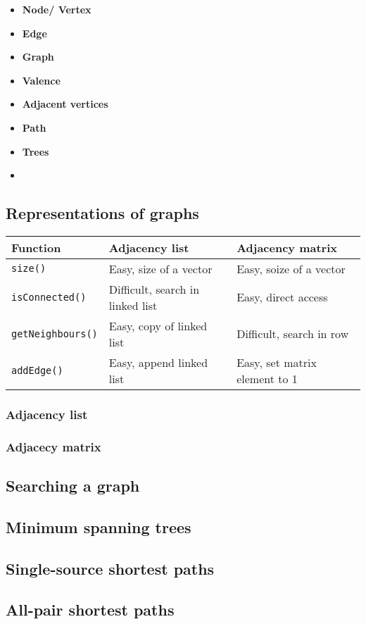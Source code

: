 
\begin{itemize}
    \item \textbf{Node/ Vertex}
    \item \textbf{Edge}
    \item \textbf{Graph}
    \item \textbf{Valence}
    \item \textbf{Adjacent vertices}
    \item \textbf{Path}
    \item \textbf{Trees}
    \item \textbf{}
\end{itemize}

\subsection{Representations of graphs}

\begin{table}[H]
    \centering
    \begin{tabular}{p{30mm} | p{50mm} | p{50mm}}
        \toprule
        \textbf{Function} & \textbf{Adjacency list} & \textbf{Adjacency matrix} \\
        \midrule
        \lstinline|size()| & Easy, size of a vector & Easy, soize of a vector \\
        \midrule
        \lstinline|isConnected()| & Difficult, search in linked list & Easy, direct access \\
        \midrule
        \lstinline|getNeighbours()| & Easy, copy of linked list & Difficult, search in row \\
        \midrule
        \lstinline|addEdge()| & Easy, append linked list & Easy, set matrix element to 1 \\
        \bottomrule
    \end{tabular}
\end{table}

\subsubsection{Adjacency list}



\subsubsection{Adjacecy matrix}



\subsection{Searching a graph}

\subsection{Minimum spanning trees}

\subsection{Single-source shortest paths}

\subsection{All-pair shortest paths}